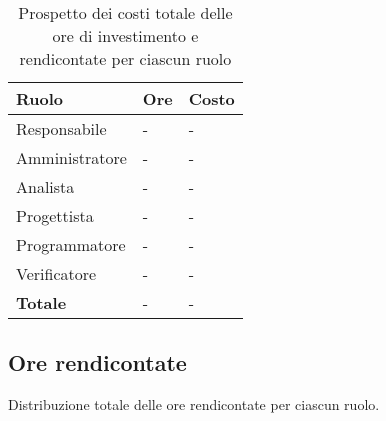			\begin{longtable}{ 
				>{\centering}p{} 
				>{\centering}p{}
				>{\centering\arraybackslash}p{} }
	
				\caption {Prospetto dei costi totale delle ore di investimento e rendicontate per ciascun ruolo}		\\
			
				\textbf{\color{white}Ruolo} & 
				\textbf{\color{white}Ore} & 
				\textbf{\color{white}Costo }
				\tabularnewline  
				\endhead
			
				Responsabile & - & - \\
				Amministratore & - & - \\
				Analista & - & - \\
				Progettista & - & - \\
				Programmatore & - & - \\
				Verificatore & - & - \\
				\textbf{Totale} & - & - \\
			\end{longtable}
		
	
	\subsection{Ore rendicontate}
			Distribuzione totale delle ore rendicontate per ciascun ruolo.

